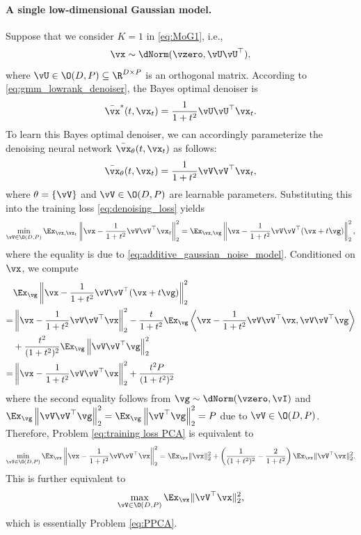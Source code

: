 \documentclass[../../book-main.tex]{subfiles}
\begin{document}
{\paragraph{A single low-dimensional Gaussian model.} Suppose that we consider $K=1$ in \eqref{eq:MoG1}, i.e., 
$$\vx \sim   \dNorm(\vzero, \vU\vU^{\top}),$$ 
where \(\vU \in \O(D, P) \subseteq \R^{D \times P}\) is an orthogonal matrix. According to \eqref{eq:gmm_lowrank_denoiser}, the  Bayes optimal denoiser is 
\begin{align}
    \bar{\vx}^{\ast}(t, \vx_{t}) = \frac{1}{1 + t^{2}} \vU\vU^\top\vx_t. 
\end{align}
To learn this Bayes optimal denoiser, we can accordingly parameterize the denoising neural network $\bar{\vx}_{\theta}(t,\vx_t)$ as follows: 
\begin{align}
    \bar{\vx}_{\theta}(t,\vx_t) = \frac{1}{1 + t^{2}} \vV\vV^\top\vx_t,
\end{align}
where $\theta = \{\vV\}$ and $\vV \in \O(D, P)$ are learnable parameters. Substituting this into the training loss \eqref{eq:denoising_loss} yields 
\begin{equation}\label{eq:training loss PCA}
	  \min_{\vV \in \O(D, P)}\Ex_{\vx, \vx_{t}}\left\|\vx - \frac{1}{1 + t^{2}} \vV\vV^\top\vx_t\right\|_{2}^{2} = \Ex_{\vx, \vg}\left\|\vx - \frac{1}{1 + t^{2}} \vV\vV^\top(\vx + t\vg)\right\|_{2}^{2},
\end{equation}
where the equality is due to \eqref{eq:additive_gaussian_noise_model}. Conditioned on $\vx$, we compute 
\begin{align}
    & \Ex_{\vg}\left\|\vx - \frac{1}{1 + t^{2}} \vV\vV^\top(\vx + t\vg)\right\|_{2}^{2} \\
    = & \left\|\vx - \frac{1}{1 + t^{2}} \vV\vV^\top \vx\right\|_{2}^{2} - \frac{t}{1+t^2}\Ex_{\vg} \left\langle \vx - \frac{1}{1 + t^{2}} \vV\vV^\top \vx,  \vV\vV^\top\vg \right\rangle \notag \\
    & + \frac{t^2}{(1+t^2)^2} \Ex_{\vg}\left\| \vV\vV^\top \vg \right\|_2^2 \\
    = & \left\|\vx - \frac{1}{1 + t^{2}} \vV\vV^\top \vx\right\|_{2}^{2} + \frac{t^2P}{(1+t^2)^2} 
\end{align}
where the second equality follows from \(\vg \sim \dNorm(\vzero, \vI)\) and $ \Ex_{\vg}\left\| \vV\vV^\top \vg \right\|_2^2 = \Ex_{\vg}\left\|\vV^\top \vg \right\|_2^2 = P$ due to $\vV \in \O(D, P)$. Therefore, Problem \eqref{eq:training loss PCA} is equivalent to 
\begin{align}
    \min_{\vV \in \O(D, P)}\Ex_{\vx} \left\|\vx - \frac{1}{1 + t^{2}} \vV\vV^\top \vx\right\|_{2}^{2} = \Ex_{\vx} \|\vx\|_2^2 + \left( \frac{1}{(1+t^2)^2} - \frac{2}{1+t^2} \right) \Ex_{\vx}\|\vV^\top \vx\|_2^2.
\end{align}
This is further equivalent to 
\begin{align}
    \max_{\vV \in \O(D, P)} \Ex_{\vx}\|\vV^\top \vx\|_2^2,
\end{align}
which is essentially Problem \eqref{eq:PPCA}. 

}
\end{document}
